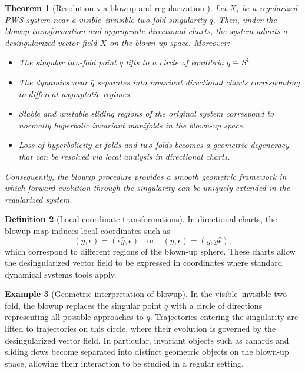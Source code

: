 \documentclass[12pt, a4paper, oneside]{book}
\theoremstyle{plain}
\newtheorem{theorem}{Theorem}[chapter]
\theoremstyle{definition}
\newtheorem{definition}[theorem]{Definition}
\newtheorem{example}[theorem]{Example}
\theoremstyle{remark}
\theoremstyle{definition}
\begin{document}
\begin{theorem}[Resolution via blowup and regularization \cite{kristiansen2019resolution}]
Let $X_\epsilon$ be a regularized PWS system near a visible–invisible two-fold singularity $q$. Then, under the blowup transformation and appropriate directional charts, the system admits a desingularized vector field $X$ on the blown-up space. Moreover:

\begin{itemize}
    \item The singular two-fold point $q$ lifts to a circle of equilibria $\bar{q} \cong S^1$.
    \item The dynamics near $\bar{q}$ separates into invariant directional charts corresponding to different asymptotic regimes.
    \item Stable and unstable sliding regions of the original system correspond to normally hyperbolic invariant manifolds in the blown-up space.
    \item Loss of hyperbolicity at folds and two-folds becomes a geometric degeneracy that can be resolved via local analysis in directional charts.
\end{itemize}

Consequently, the blowup procedure provides a smooth geometric framework in which forward evolution through the singularity can be uniquely extended in the regularized system.
\end{theorem}

\begin{definition}[Local coordinate transformations]
In directional charts, the blowup map induces local coordinates such as
\[
(y,\epsilon) = (\epsilon \hat{y}, \epsilon) \quad \text{or} \quad (y,\epsilon) = (y, y \hat{\epsilon}),
\]
which correspond to different regions of the blown-up sphere. These charts allow the desingularized vector field to be expressed in coordinates where standard dynamical systems tools apply.
\end{definition}

\begin{example}[Geometric interpretation of blowup]
In the visible–invisible two-fold, the blowup replaces the singular point $q$ with a circle of directions representing all possible approaches to $q$. Trajectories entering the singularity are lifted to trajectories on this circle, where their evolution is governed by the desingularized vector field. In particular, invariant objects such as canards and sliding flows become separated into distinct geometric objects on the blown-up space, allowing their interaction to be studied in a regular setting.
\end{example}
\end{document}
